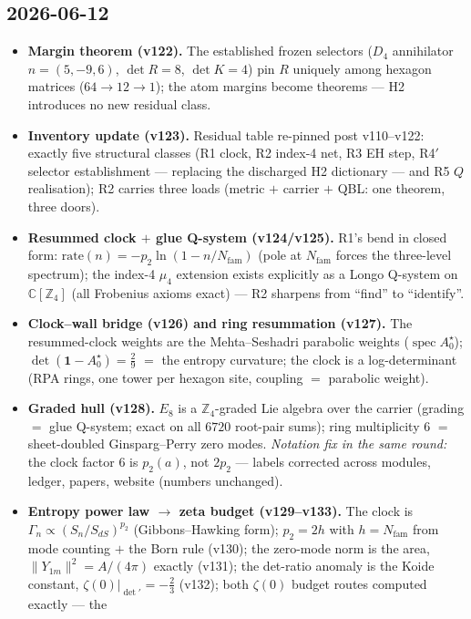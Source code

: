 \documentclass[11pt]{article}
\begin{document}
\subsection*{2026-06-12}
\begin{itemize}
\item \textbf{Margin theorem (v122).} The established frozen selectors ($D_4$ annihilator
  $n=(5,-9,6)$, $\det R=8$, $\det K=4$) pin $R$ uniquely among hexagon matrices
  ($64\to12\to1$); the atom margins become theorems --- H2 introduces no new residual class.
\item \textbf{Inventory update (v123).} Residual table re-pinned post v110--v122: exactly five
  structural classes (R1 clock, R2 index-4 net, R3 EH step, R4$'$ selector establishment ---
  replacing the discharged H2 dictionary --- and R5 $Q$ realisation); R2 carries three loads
  (metric $+$ carrier $+$ QBL: one theorem, three doors).
\item \textbf{Resummed clock $+$ glue Q-system (v124/v125).} R1's bend in closed form:
  $\mathrm{rate}(n)=-p_2\ln(1-n/N_{\mathrm{fam}})$ (pole at $N_{\mathrm{fam}}$ forces the
  three-level spectrum); the index-4 $\mu_4$ extension exists explicitly as a Longo Q-system
  on $\mathbb C[\mathbb Z_4]$ (all Frobenius axioms exact) --- R2 sharpens from ``find'' to
  ``identify''.
\item \textbf{Clock--wall bridge (v126) and ring resummation (v127).} The resummed-clock
  weights are the Mehta--Seshadri parabolic weights ($\operatorname{spec}A_0^\star$);
  $\det(\mathbf 1-A_0^\star)=\tfrac29$ $=$ the entropy curvature; the clock is a
  log-determinant (RPA rings, one tower per hexagon site, coupling $=$ parabolic weight).
\item \textbf{Graded hull (v128).} $E_8$ is a $\mathbb Z_4$-graded Lie algebra over the
  carrier (grading $=$ glue Q-system; exact on all $6720$ root-pair sums); ring multiplicity
  $6$ $=$ sheet-doubled Ginsparg--Perry zero modes. \emph{Notation fix in the same round:}
  the clock factor $6$ is $p_2(a)$, not $2p_2$ --- labels corrected across modules, ledger,
  papers, website (numbers unchanged).
\item \textbf{Entropy power law $\to$ zeta budget (v129--v133).} The clock is
  $\Gamma_n\propto(S_n/S_{dS})^{p_2}$ (Gibbons--Hawking form); $p_2=2h$ with
  $h=N_{\mathrm{fam}}$ from mode counting $+$ the Born rule (v130); the zero-mode norm is the
  area, $\|Y_{1m}\|^2=A/(4\pi)$ exactly (v131); the det-ratio anomaly is the Koide constant,
  $\zeta(0)|_{\det'}=-\tfrac23$ (v132); both $\zeta(0)$ budget routes computed exactly --- the

\end{itemize}
\end{document}
